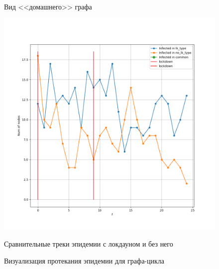 \begin{figure}[h]
\begin{center}
\begin{minipage}{0.49\linewidth}
				\centering
				Вид <<домашнего>> графа
			\end{minipage}
		\end{center}
		
		\begin{center}
			\begin{minipage}{0.49\linewidth}
				\includegraphics[width=\linewidth, keepaspectratio]{../figs/evidence3/tracks}
				
				\centering
				Сравнительные треки эпидемии с локдауном и без него
			\end{minipage}
		\end{center}
		
		\caption{Визуализация протекания эпидемии для графа-цикла}\label{pic:evidence_2}
	\end{figure}

	\printbibliography
	
